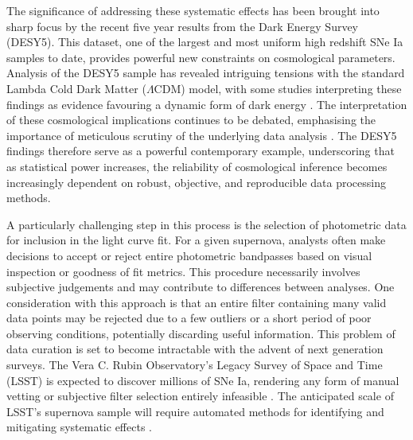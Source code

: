 The significance of addressing these systematic effects has been brought into sharp focus by the recent five year results from the Dark Energy Survey (DESY5). This dataset, one of the largest and most uniform high redshift SNe Ia samples to date, provides powerful new constraints on cosmological parameters. Analysis of the DESY5 sample has revealed intriguing tensions with the standard Lambda Cold Dark Matter ($\Lambda$CDM) model, with some studies interpreting these findings as evidence favouring a dynamic form of dark energy \citep{arXiv:2406.06389, arXiv:2405.03983}. The interpretation of these cosmological implications continues to be debated, emphasising the importance of meticulous scrutiny of the underlying data analysis \citep{arXiv:2503.17342}. The DESY5 findings therefore serve as a powerful contemporary example, underscoring that as statistical power increases, the reliability of cosmological inference becomes increasingly dependent on robust, objective, and reproducible data processing methods.

A particularly challenging step in this process is the selection of photometric data for inclusion in the light curve fit. For a given supernova, analysts often make decisions to accept or reject entire photometric bandpasses based on visual inspection or goodness of fit metrics. This procedure necessarily involves subjective judgements and may contribute to differences between analyses. One consideration with this approach is that an entire filter containing many valid data points may be rejected due to a few outliers or a short period of poor observing conditions, potentially discarding useful information. This problem of data curation is set to become intractable with the advent of next generation surveys. The Vera C. Rubin Observatory's Legacy Survey of Space and Time (LSST) is expected to discover millions of SNe Ia, rendering any form of manual vetting or subjective filter selection entirely infeasible \citep{Ivezic2019, LSST_DESC2012, Mandelbaum2019}. The anticipated scale of LSST's supernova sample will require automated methods for identifying and mitigating systematic effects \citep{Arendse2023, Wojtak2019, Hlozek2019, Foley2018}.

